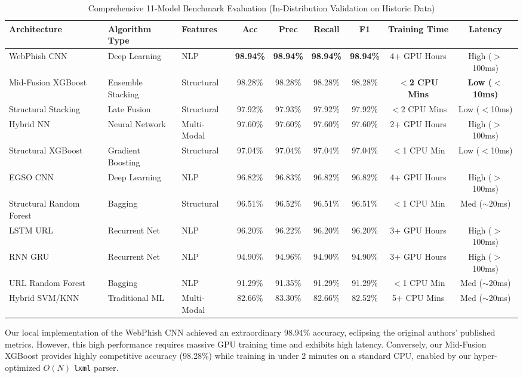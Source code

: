 \documentclass[conference]{IEEEtran}
\begin{document}
\begin{table}[t]
\caption{Comprehensive 11-Model Benchmark Evaluation (In-Distribution Validation on Historic Data)}
\begin{center}
\begin{tabular}{l l l c c c c | c c}
\toprule
\textbf{Architecture} & \textbf{Algorithm Type} & \textbf{Features} & \textbf{Acc} & \textbf{Prec} & \textbf{Recall} & \textbf{F1} & \textbf{Training Time} & \textbf{Latency} \\
\midrule
WebPhish CNN & Deep Learning & NLP & \textbf{98.94\%} & \textbf{98.94\%} & \textbf{98.94\%} & \textbf{98.94\%} & 4+ GPU Hours & High ($>$100ms) \\
Mid-Fusion XGBoost & Ensemble Stacking & Structural & 98.28\% & 98.28\% & 98.28\% & 98.28\% & \textbf{$<$2 CPU Mins} & \textbf{Low ($<$10ms)} \\
Structural Stacking & Late Fusion & Structural & 97.92\% & 97.93\% & 97.92\% & 97.92\% & $<$2 CPU Mins & Low ($<$10ms) \\
Hybrid NN & Neural Network & Multi-Modal & 97.60\% & 97.60\% & 97.60\% & 97.60\% & 2+ GPU Hours & High ($>$100ms) \\
Structural XGBoost & Gradient Boosting & Structural & 97.04\% & 97.04\% & 97.04\% & 97.04\% & $<$1 CPU Min & Low ($<$10ms) \\
EGSO CNN & Deep Learning & NLP & 96.82\% & 96.83\% & 96.82\% & 96.82\% & 4+ GPU Hours & High ($>$100ms) \\
Structural Random Forest & Bagging & Structural & 96.51\% & 96.52\% & 96.51\% & 96.51\% & $<$1 CPU Min & Med ($\sim$20ms) \\
LSTM URL & Recurrent Net & NLP & 96.20\% & 96.22\% & 96.20\% & 96.20\% & 3+ GPU Hours & High ($>$100ms) \\
RNN GRU & Recurrent Net & NLP & 94.90\% & 94.96\% & 94.90\% & 94.90\% & 3+ GPU Hours & High ($>$100ms) \\
URL Random Forest & Bagging & NLP & 91.29\% & 91.35\% & 91.29\% & 91.29\% & $<$1 CPU Min & Med ($\sim$20ms) \\
Hybrid SVM/KNN & Traditional ML & Multi-Modal & 82.66\% & 83.30\% & 82.66\% & 82.52\% & 5+ CPU Mins & Med ($\sim$20ms) \\
\bottomrule
\end{tabular}
\label{tab:full_models}
\end{center}
\end{table}

Our local implementation of the WebPhish CNN achieved an extraordinary 98.94\% accuracy, eclipsing the original authors' published metrics. However, this high performance requires massive GPU training time and exhibits high latency. Conversely, our Mid-Fusion XGBoost provides highly competitive accuracy (98.28\%) while training in under 2 minutes on a standard CPU, enabled by our hyper-optimized $O(N)$ \texttt{lxml} parser.
\end{document}
